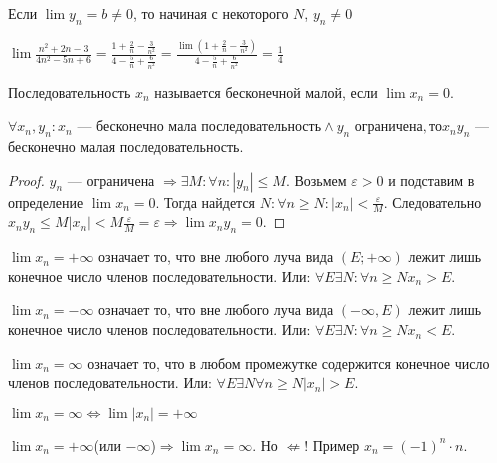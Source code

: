  \begin{remark}
    Если $\lim y_n = b \neq 0$, то начиная с некоторого  $N$,  $y_n \neq 0$
\end{remark}
\begin{example}
    $\lim \frac{n^2+2n-3}{4n^2-5n+6} = \frac{1 + \frac{2}{n} - \frac{3}{n^2}}{4-\frac{5}{n}+\frac{6}{n^2}} = \frac{\lim(1+\frac{2}{n}-\frac{3}{n^2})}{4 - \frac{5}{n}+\frac{6}{n^2}} = \frac{1}{4}$
\end{example}
\begin{definition}
    Последовательность $x_n$ называется бесконечной малой, если $\lim x_n=0$.
\end{definition}
\begin{statement}
    $\forall x_n, y_n: x_n\text{ --- бесконечно мала последовательность} \land y_n\text{ ограничена}, то x_ny_n$ --- бесконечно малая последовательность.
\end{statement}
\begin{proof}
    $y_n$ --- ограничена  $\Rightarrow \exists M: \forall n: |y_n| \le M$. Возьмем $\varepsilon > 0$ и подставим в определение  $\lim x_n = 0$. Тогда найдется  $N: \forall n \ge N: |x_n| < \frac{\varepsilon}{M}$. Следовательно $x_ny_n \le M |x_n| < M \frac{\varepsilon}{M} = \varepsilon \Rightarrow \lim x_n y_n = 0$.
\end{proof}
\begin{definition}
    $\lim x_n = +\infty$ означает то, что вне любого луча вида  $(E; +\infty)$ лежит лишь конечное число членов последовательности. Или:  $\forall E \exists N: \forall n \ge N x_n > E$.
\end{definition}
\begin{definition}
    $\lim x_n = -\infty$ означает то, что вне любого луча вида  $(-\infty, E)$ лежит лишь конечное число членов последовательности. Или:  $\forall E \exists N: \forall n \ge N x_n < E$.
\end{definition}
\begin{definition}
    $\lim x_n = \infty$ означает то, что в любом промежутке содержится конечное число членов последовательности. Или:  $\forall E \exists N \forall n \ge N |x_n| > E$.
\end{definition}
\begin{remark}
    $\lim x_n = \infty \iff \lim |x_n| = +\infty$
\end{remark}
\begin{remark}
    $\lim x_n = +\infty$(или $-\infty$)$\Rightarrow \lim x_n=\infty$. Но $\not \Leftarrow$! Пример  $x_n = (-1)^n \cdot n$.
\end{remark}

